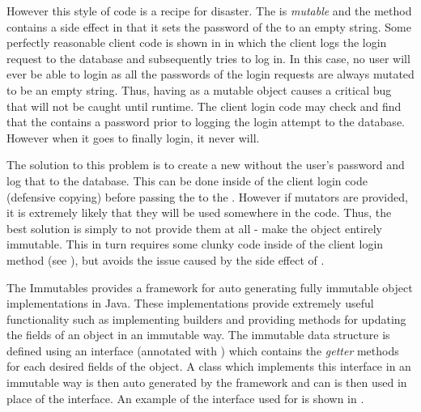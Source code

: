 



However this style of code is a recipe for disaster. The  is \textit{mutable} and the  method contains a side effect in that it sets the password of the  to an empty string. Some perfectly reasonable client code is shown in  in which the client logs the login request to the database and subsequently tries to log in. In this case, no user will ever be able to login as all the passwords of the login requests are always mutated to be an empty string. Thus, having  as a mutable object causes a critical bug that will not be caught until runtime. The client login code may check and find that the  contains a password prior to logging the login attempt to the database. However when it goes to finally login, it never will.



The solution to this problem is to create a new  without the user's password and log that to the database. This can be done inside of the client login code (defensive copying) before passing the  to the . However if mutators are provided, it is extremely likely that they will be used somewhere in the code. Thus, the best solution is simply to not provide them at all - make the object entirely immutable. This in turn requires some clunky code inside of the client login method (see ), but avoids the issue caused by the side effect of . 



The Immutables \cite{immutablesJava} provides a framework for auto generating fully immutable object implementations in Java. These implementations provide extremely useful functionality such as implementing builders and providing methods for updating the fields of an object in an immutable way. The immutable data structure is defined using an interface (annotated with ) which contains the \textit{getter} methods for each desired fields of the object. A class which implements this interface in an immutable way is then auto generated by the framework and can is then used in place of the interface. An example of the interface used for  is shown in .


